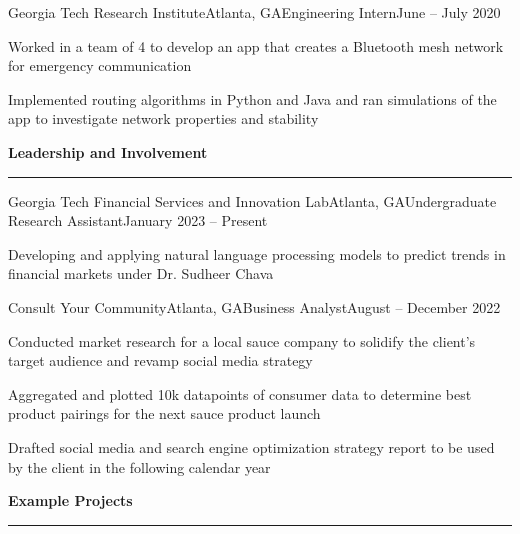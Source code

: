 \documentclass{article}
\newcommand{\horizontal}{\vspace{2pt}\hrule}
\newcommand{\sectitle}[1]{\vspace{2pt} \textbf{\large #1} \horizontal}
\begin{document}
\begin{flushleft}
    \begin{experience}{Georgia Tech Research Institute}{Atlanta, GA}{Engineering Intern}{June -- July 2020}
        \item Worked in a team of 4 to develop an app that creates a Bluetooth mesh network for emergency communication
        \item Implemented routing algorithms in Python and Java and ran simulations of the app to investigate network properties and stability
    \end{experience}


\sectitle{Leadership and Involvement}

    \begin{experience}{Georgia Tech Financial Services and Innovation Lab}{Atlanta, GA}{Undergraduate Research Assistant}{January 2023 -- Present}
        \item Developing and applying natural language processing models to predict trends in financial markets under Dr. Sudheer Chava
    \end{experience}

    \begin{experience}{Consult Your Community}{Atlanta, GA}{Business Analyst}{August -- December 2022}
        \item Conducted market research for a local sauce company to solidify the client's target audience and revamp social media strategy
        \item Aggregated and plotted 10k datapoints of consumer data to determine best product pairings for the next sauce product launch
        \item Drafted social media and search engine optimization strategy report to be used by the client in the following calendar year
    \end{experience}

\sectitle{Example Projects}

    \vspace{3pt}


\end{flushleft}
\end{document}
